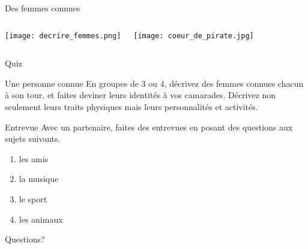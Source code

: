 \documentclass{beamer}
\begin{document}
  \begin{frame}{Des femmes connues}
    \begin{columns}
        \texttt{[image: decrire\_femmes.png]}
        \begin{minipage}[t][0.6\textheight]{\linewidth}
          \texttt{[image: coeur\_de\_pirate.jpg]}
        \end{minipage}
    \end{columns}
  \end{frame}

  \begin{frame}{}
    \begin{center}
      \Large Quiz
    \end{center}
  \end{frame}

  \begin{frame}{Une personne connue}
    En groupes de 3 ou 4, décrivez des femmes connues chacun à son tour, et faites deviner leurs identités à vos camarades. Décrivez non seulement leurs traits physiques mais leurs personnalités et activités. \\
  \end{frame}

  \begin{frame}{Entrevue}
    Avec un partenaire, faites des entrevues en posant des questions aux sujets suivants.  \\
    \begin{enumerate}
      \item les amis
      \item la musique
      \item le sport
      \item les animaux
    \end{enumerate}
  \end{frame}

  \begin{frame}{}
    \begin{center}
      \Large Questions?
    \end{center}
  \end{frame}
\end{document}
